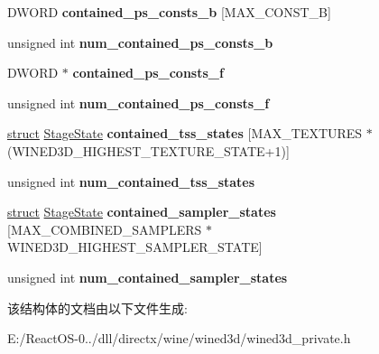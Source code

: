 \begin{DoxyCompactItemize}
D\+W\+O\+RD {\bfseries contained\+\_\+ps\+\_\+consts\+\_\+b} \mbox{[}M\+A\+X\+\_\+\+C\+O\+N\+S\+T\+\_\+B\mbox{]}
\item 
\mbox{\label{structwined3d__stateblock_a9ab26b59738569f30e6c15532225f6c0}} 
unsigned int {\bfseries num\+\_\+contained\+\_\+ps\+\_\+consts\+\_\+b}
\item 
\mbox{\label{structwined3d__stateblock_a63e12ecaba5ed187f6e049c9b4cd4968}} 
D\+W\+O\+RD $\ast$ {\bfseries contained\+\_\+ps\+\_\+consts\+\_\+f}
\item 
\mbox{\label{structwined3d__stateblock_a4ee0aa7993aa66429d10362451b70f09}} 
unsigned int {\bfseries num\+\_\+contained\+\_\+ps\+\_\+consts\+\_\+f}
\item 
\mbox{\label{structwined3d__stateblock_aa2ac7b87052b956a48749dee6fd49657}} 
\hyperlink{interfacestruct}{struct} \hyperlink{struct_stage_state}{Stage\+State} {\bfseries contained\+\_\+tss\+\_\+states} \mbox{[}M\+A\+X\+\_\+\+T\+E\+X\+T\+U\+R\+ES $\ast$(W\+I\+N\+E\+D3\+D\+\_\+\+H\+I\+G\+H\+E\+S\+T\+\_\+\+T\+E\+X\+T\+U\+R\+E\+\_\+\+S\+T\+A\+TE+1)\mbox{]}
\item 
\mbox{\label{structwined3d__stateblock_a9289328fa28b2cf5efafc2d8cb0ff266}} 
unsigned int {\bfseries num\+\_\+contained\+\_\+tss\+\_\+states}
\item 
\mbox{\label{structwined3d__stateblock_ac94252c0a44bc696fcafeed940d06d2c}} 
\hyperlink{interfacestruct}{struct} \hyperlink{struct_stage_state}{Stage\+State} {\bfseries contained\+\_\+sampler\+\_\+states} \mbox{[}M\+A\+X\+\_\+\+C\+O\+M\+B\+I\+N\+E\+D\+\_\+\+S\+A\+M\+P\+L\+E\+RS $\ast$W\+I\+N\+E\+D3\+D\+\_\+\+H\+I\+G\+H\+E\+S\+T\+\_\+\+S\+A\+M\+P\+L\+E\+R\+\_\+\+S\+T\+A\+TE\mbox{]}
\item 
\mbox{\label{structwined3d__stateblock_a106f0247599795264b9a88ba481ac6a1}} 
unsigned int {\bfseries num\+\_\+contained\+\_\+sampler\+\_\+states}
\end{DoxyCompactItemize}


该结构体的文档由以下文件生成\+:\begin{DoxyCompactItemize}
\item 
E\+:/\+React\+O\+S-\/0../dll/directx/wine/wined3d/wined3d\+\_\+private.\+h\end{DoxyCompactItemize}
